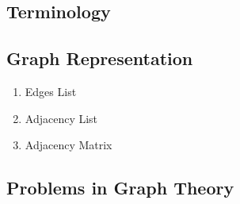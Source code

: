 \documentclass{article}
\begin{document}
\subsection{Terminology}
\subsection{Graph Representation}

\begin{enumerate}
    \item Edges List
    \item Adjacency List
    \item Adjacency Matrix
\end{enumerate}

\subsection{Problems in Graph Theory}
\end{document}
